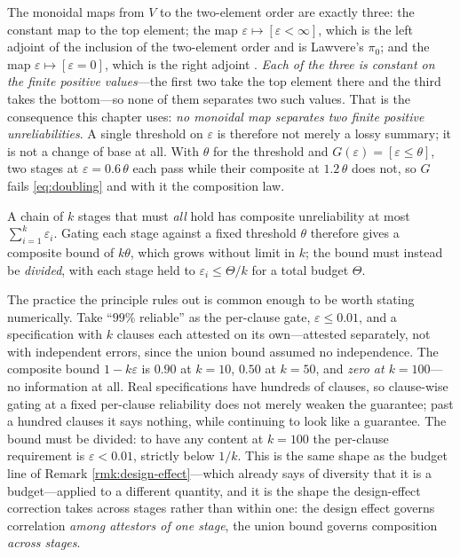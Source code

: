 The monoidal maps from $V$ to the two-element order are exactly three: the constant map to the top
element; the map $\varepsilon \mapsto [\varepsilon < \infty]$, which is the left adjoint of the
inclusion of the two-element order and is Lawvere's $\pi_0$; and the map
$\varepsilon \mapsto [\varepsilon = 0]$, which is the right adjoint \cite{lawvere1973}. \emph{Each of the three is constant on the finite positive values}---the first two take the top
element there and the third takes the bottom---so none of them separates two such values. That is
the consequence this chapter uses: \emph{no monoidal map separates two finite positive
unreliabilities}. A single threshold on $\varepsilon$ is therefore not merely a lossy summary; it is
not a change of base at all. With $\theta$ for the threshold and $G(\varepsilon) = [\varepsilon \leq
\theta]$, two stages at $\varepsilon = 0.6\,\theta$ each pass while their composite at
$1.2\,\theta$ does not, so $G$ fails \eqref{eq:doubling} and with it the composition law.

\begin{principle}\label{pr:budget}
A chain of $k$ stages that must \emph{all} hold has composite unreliability at most
$\sum_{i=1}^{k}\varepsilon_i$. Gating each stage against a fixed threshold $\theta$ therefore gives a
composite bound of $k\theta$, which grows without limit in $k$; the bound must instead be
\emph{divided}, with each stage held to $\varepsilon_i \leq \Theta/k$ for a total budget $\Theta$.
\end{principle}

The practice the principle rules out is common enough to be worth stating numerically. Take
``$99\%$ reliable'' as the per-clause gate, $\varepsilon \leq 0.01$, and a specification with $k$
clauses each attested on its own---attested separately, not with independent errors, since the union
bound assumed no independence. The composite bound $1-k\varepsilon$ is $0.90$ at $k = 10$, $0.50$ at
$k = 50$, and \emph{zero at $k = 100$}---no information at all. Real specifications have hundreds of
clauses, so clause-wise gating at a fixed per-clause reliability does not merely weaken the
guarantee; past a hundred clauses it says nothing, while continuing to look like a guarantee. The
bound must be divided: to have any content at $k = 100$ the per-clause requirement is
$\varepsilon < 0.01$, strictly below $1/k$. This is the same shape as the budget line of Remark
\ref{rmk:design-effect}---which already says of diversity that it is a budget---applied to a
different quantity, and it is the shape the design-effect correction takes across stages rather than
within one: the design effect governs correlation \emph{among attestors of one stage}, the union
bound governs composition \emph{across stages}.

